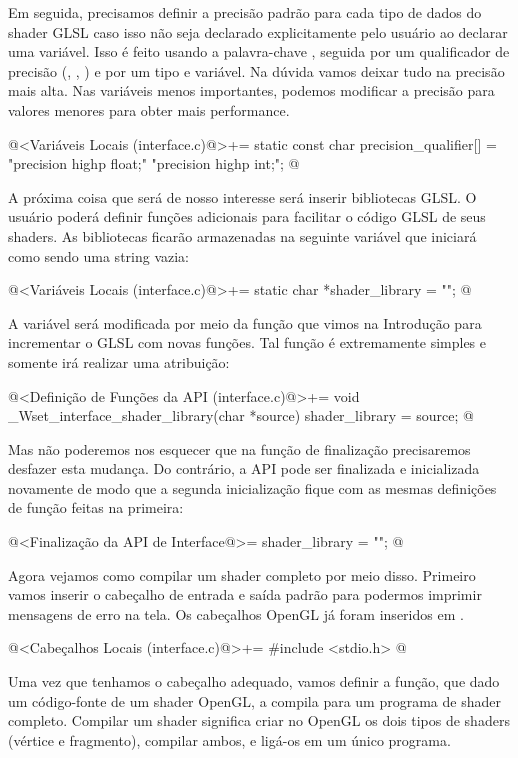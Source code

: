 Em seguida, precisamos definir a precisão padrão para cada tipo de
dados do shader GLSL caso isso não seja declarado explicitamente pelo
usuário ao declarar uma variável. Isso é feito usando a palavra-chave
, seguida por um qualificador de precisão
(, , ) e por um
tipo e variável. Na dúvida vamos deixar tudo na precisão mais
alta. Nas variáveis menos importantes, podemos modificar a precisão
para valores menores para obter mais performance.

\iniciocodigo
@<Variáveis Locais (interface.c)@>+=
static const char precision_qualifier[] = "precision highp float;\n"
                                          "precision highp int;\n";
@
\fimcodigo

A próxima coisa que será de nosso interesse será inserir bibliotecas
GLSL. O usuário poderá definir funções adicionais para facilitar o
código GLSL de seus shaders. As bibliotecas ficarão armazenadas na
seguinte variável que iniciará como sendo uma string vazia:

\iniciocodigo
@<Variáveis Locais (interface.c)@>+=
static char *shader_library = "";
@
\fimcodigo

A variável será modificada por meio da função que vimos na Introdução
para incrementar o GLSL com novas funções. Tal função é extremamente
simples e somente irá realizar uma atribuição:

\iniciocodigo
@<Definição de Funções da API (interface.c)@>+=
void _Wset_interface_shader_library(char *source){
  shader_library = source;
}
@
\fimcodigo

Mas não poderemos nos esquecer que na função de finalização
precisaremos desfazer esta mudança. Do contrário, a API pode ser
finalizada e inicializada novamente de modo que a segunda
inicialização fique com as mesmas definições de função feitas na
primeira:

\iniciocodigo
@<Finalização da API de Interface@>=
shader_library = "";
@
\fimcodigo

Agora vejamos como compilar um shader completo por meio
disso. Primeiro vamos inserir o cabeçalho de entrada e saída padrão
para podermos imprimir mensagens de erro na tela. Os cabeçalhos OpenGL
já foram inseridos em .

\iniciocodigo
@<Cabeçalhos Locais (interface.c)@>+=
#include <stdio.h>
@
\fimcodigo

Uma vez que tenhamos o cabeçalho adequado, vamos definir a função, que
dado um código-fonte de um shader OpenGL, a compila para um programa
de shader completo. Compilar um shader significa criar no OpenGL os
dois tipos de shaders (vértice e fragmento), compilar ambos, e ligá-os
em um único programa.

